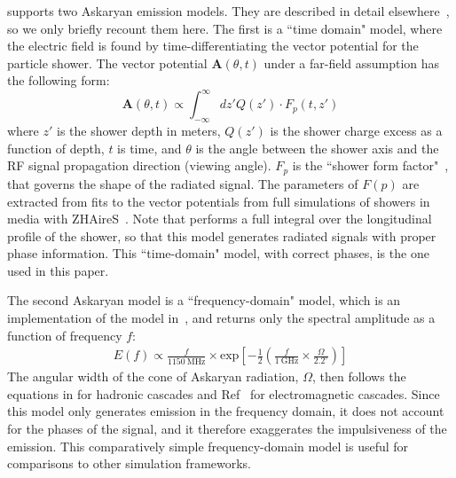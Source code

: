             \arasim{} supports two Askaryan emission models.
            They are described in detail elsewhere~\citep{hong_thesis},
            so we only briefly recount them here.
            The first is a ``time domain" model, where the electric field is found by time-differentiating the vector potential for the particle shower.
            The vector potential $\mathbf{A}(\theta, t)$
            under a far-field assumption has the following form:
            \begin{equation}
            \mathbf{A}(\theta, t) \propto\int_{-\infty}^{\infty} dz' Q(z') \cdot F_p\!\left(t, z'\right)
            \end{equation}
            where $z'$ is the shower depth in meters, $Q(z')$
            is the shower charge excess as a function of depth,
            $t$ is time, and $\theta$ is the angle between the shower axis
            and the RF signal propagation direction (viewing angle).
            $F_p$ is the ``shower form factor"~\citep{AZ-airshowers}, that 
            governs the shape of the radiated signal.
            The parameters of $F(p)$ are extracted from fits
            to the vector potentials from full simulations of 
            showers in media with ZHAireS~\citep{ARZ-signal}.
            Note that \arasim{} performs a full integral over the longitudinal
            profile of the shower, so that this model generates
            radiated signals with proper phase information.
            This ``time-domain" model, with correct phases,
            is the one used in this paper.

            The second Askaryan model is a ``frequency-domain" model,
            which is an implementation of the model in~\citep{showerenergy},
            and returns only the spectral amplitude as a function of frequency $f$:
            \begin{align}
              E(f) \propto \frac{f}{1150~\text{MHz}}\times \text{exp}\left[ - \frac{1}{2} \left( \frac{f}{1~\text{GHz}} \times \frac{\Omega}{2.2^{\circ}} \right)\right]
              \label{eq:alvarez-muniz}
            \end{align}
            The angular width of the cone of Askaryan radiation, $\Omega$, then follows the equations in \citep{had-cone} for hadronic cascades and Ref~\citep{lpm_modeling} for electromagnetic cascades.
            Since this model only generates emission in the frequency
            domain, it does not account for the
            phases of the signal, and it therefore exaggerates the
            impulsiveness of the emission.
            This comparatively simple frequency-domain model is useful for comparisons to other simulation frameworks.


